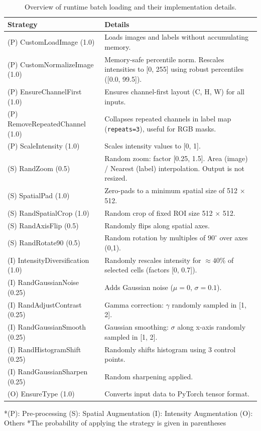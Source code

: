 \begin{table}[ht]
\centering
\footnotesize %
\caption{Overview of runtime batch loading and their implementation details.}
\label{tab:4.4}
\begin{tabular}{l p{8.0cm}} %
\toprule %
\textbf{Strategy} & \textbf{Details} \\
\midrule
\midrule
(P) CustomLoadImage (1.0) & Loads images and labels without accumulating memory. \\
(P) CustomNormalizeImage (1.0) & Memory-safe percentile norm. Rescales intensities to [0, 255] using robust percentiles ([0.0, 99.5]). \\
(P) EnsureChannelFirst (1.0) & Ensures channel-first layout (C, H, W) for all inputs. \\
(P) RemoveRepeatedChannel (1.0) & Collapses repeated channels in label map (\texttt{repeats=3}), useful for RGB masks. \\
(P) ScaleIntensity (1.0) & Scales intensity values to [0, 1]. \\
\midrule
(S) RandZoom (0.5) & Random zoom: factor [0.25, 1.5]. Area (image) / Nearest (label) interpolation. Output is not resized. \\
(S) SpatialPad (1.0) & Zero-pads to a minimum spatial size of 512 $\times$ 512. \\
(S) RandSpatialCrop (1.0) & Random crop of fixed ROI size 512 $\times$ 512. \\
(S) RandAxisFlip (0.5) & Randomly flips along spatial axes. \\
(S) RandRotate90 (0.5) & Random rotation by multiples of $90^\circ$ over axes (0,1). \\
\midrule
(I) IntensityDiversification (1.0) & Randomly rescales intensity for $\approx 40\%$ of selected cells (factors [0, 0.7]). \\
(I) RandGaussianNoise (0.25) & Adds Gaussian noise ($\mu=0$, $\sigma=0.1$). \\
(I) RandAdjustContrast (0.25) & Gamma correction: $\gamma$ randomly sampled in [1, 2]. \\
(I) RandGaussianSmooth (0.25) & Gaussian smoothing: $\sigma$ along x-axis randomly sampled in [1, 2]. \\
(I) RandHistogramShift (0.25) & Randomly shifts histogram using 3 control points. \\
(I) RandGaussianSharpen (0.25) & Random sharpening applied. \\
\midrule
(O) EnsureType (1.0) & Converts input data to PyTorch tensor format. \\
\bottomrule %
\end{tabular}

\vspace{0.5em}
\small
{\raggedright 
*(P): Pre-processing (S): Spatial Augmentation (I): Intensity Augmentation (O): Others
*The probability of applying the strategy is given in parentheses\par}
\end{table}

